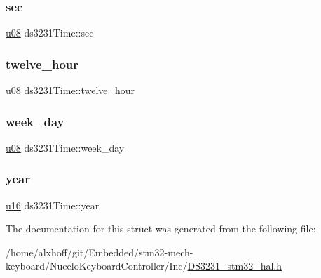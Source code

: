 \mbox{\label{structds3231Time_a77bddffed38f1acd8ed12155bd82816d}} 
\subsubsection{\texorpdfstring{sec}{sec}}
{\footnotesize\ttfamily \hyperlink{main_8h_ae2b6b8613a28b013c8c7fdaf93cdb1e1}{u08} ds3231\+Time\+::sec}

\mbox{\label{structds3231Time_a63132a576ab3e42364166a69bd666928}} 
\subsubsection{\texorpdfstring{twelve\+\_\+hour}{twelve\_hour}}
{\footnotesize\ttfamily \hyperlink{main_8h_ae2b6b8613a28b013c8c7fdaf93cdb1e1}{u08} ds3231\+Time\+::twelve\+\_\+hour}

\mbox{\label{structds3231Time_ac3a99ede54dd49063699038f7fcadf89}} 
\subsubsection{\texorpdfstring{week\+\_\+day}{week\_day}}
{\footnotesize\ttfamily \hyperlink{main_8h_ae2b6b8613a28b013c8c7fdaf93cdb1e1}{u08} ds3231\+Time\+::week\+\_\+day}

\mbox{\label{structds3231Time_aa0cb62f96994a2273838c848c033796e}} 
\subsubsection{\texorpdfstring{year}{year}}
{\footnotesize\ttfamily \hyperlink{main_8h_a2b19d553290a8d4a083d3c03280ea800}{u16} ds3231\+Time\+::year}



The documentation for this struct was generated from the following file\+:\begin{DoxyCompactItemize}
\item 
/home/alxhoff/git/\+Embedded/stm32-\/mech-\/keyboard/\+Nucelo\+Keyboard\+Controller/\+Inc/\hyperlink{DS3231__stm32__hal_8h}{D\+S3231\+\_\+stm32\+\_\+hal.\+h}\end{DoxyCompactItemize}
